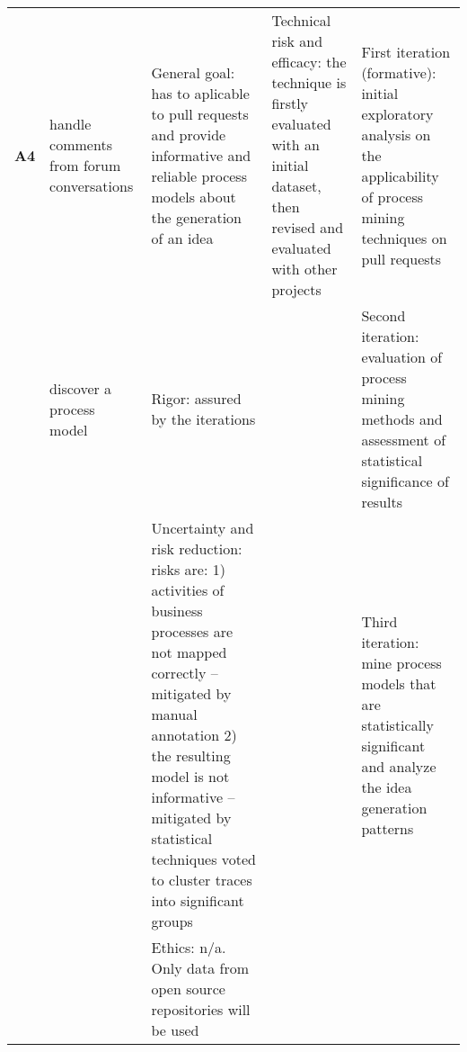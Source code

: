 \begin{longtable}[c]{@{}p{1.2cm}p{2.5cm}p{5cm}p{3cm}p{4cm}@{}}
\textbf{A4}       & handle comments from forum conversations       & General goal: has to aplicable to pull requests and provide informative and reliable process models about the generation of an idea                                                                                                                                      & Technical risk and efficacy: the technique is firstly evaluated with an initial dataset, then revised and evaluated with other projects              & First iteration (formative): initial exploratory analysis on the applicability of process mining techniques on pull requests  \\
                  & discover a process model                       & Rigor: assured by the iterations                                                                                                                                                                                                                                         &                                                                                                                                                      & Second iteration: evaluation of process mining methods and assessment of statistical significance of results                  \\
                  &                                                & Uncertainty and risk reduction: risks are: 1) activities of business processes are not mapped correctly – mitigated by manual annotation 2) the resulting model is not informative – mitigated by statistical techniques voted to cluster traces into significant groups &                                                                                                                                                      & Third iteration: mine process models that are statistically significant and analyze the idea generation patterns              \\
                  &                                                & Ethics: n/a. Only data from open source repositories will be used                                                                                                                                                                                                        &                                                                                                                                                      &                                                                                                                               \\

\end{longtable}
